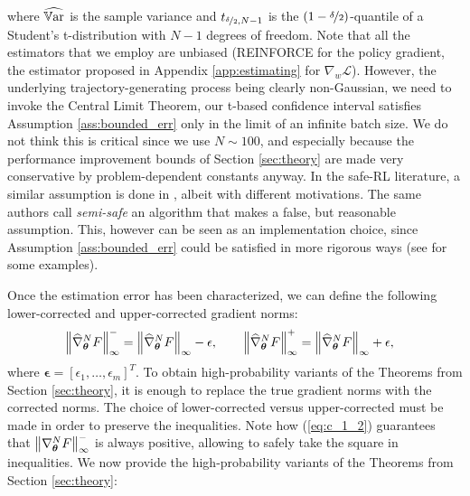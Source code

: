 where $\widehat{\Var}$ is the sample variance and $t_{\nicefrac{\delta}{2},N-1}$ is the $(1-\nicefrac{\delta}{2})$-quantile of a Student's t-distribution with $N-1$ degrees of freedom. Note that all the estimators that we employ are unbiased (REINFORCE for the policy gradient, the estimator proposed in Appendix \ref{app:estimating} for $\nabla_w\mathcal{L}$). However, the underlying trajectory-generating process being clearly non-Gaussian, we need to invoke the Central Limit Theorem, \ie our t-based confidence interval satisfies Assumption \ref{ass:bounded_err} only in the limit of an infinite batch size. We do not think this is critical since we use $N\sim 100$, and especially because the performance improvement bounds of Section \ref{sec:theory} are made very conservative by problem-dependent constants anyway. In the safe-RL literature, a similar  assumption is done in \cite{pmlr-v37-thomas15}, albeit with different motivations. The same authors call \textit{semi-safe} an algorithm that makes a false, but reasonable assumption. This, however can be seen as an implementation choice, since Assumption \ref{ass:bounded_err} could be satisfied in more rigorous ways (see \cite{adaptive_batch} for some examples).

Once the estimation error has been characterized,
we can define the following lower-corrected and upper-corrected gradient norms:
\begin{align*}
&\norm[\infty]{\widehat{\nabla}_{\vtheta}^NF}^- = \norm[\infty]{\widehat{\nabla}_{\vtheta}^NF} - \mathbf{\epsilon},  \qquad \norm[\infty]{\widehat{\nabla}_{\vtheta}^NF}^+ = \norm[\infty]{\widehat{\nabla}_{\vtheta}^NF} + \mathbf{\epsilon},
\end{align*}
where $\mathbf{\epsilon}=[\epsilon_1,\dots,\epsilon_m]^T$. To obtain high-probability variants of the Theorems from Section \ref{sec:theory}, it is enough to replace the true gradient norms with the corrected norms. The choice of lower-corrected versus upper-corrected must be made in order to preserve the inequalities. Note how (\ref{eq:c_1_2}) guarantees that $\norm[\infty]{\nabla_{\vtheta}^NF}^-$ is always positive, allowing to safely take the square in inequalities. We now provide the high-probability variants of the Theorems from Section \ref{sec:theory}:

